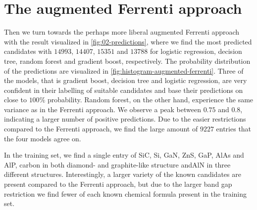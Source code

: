 \begin{comment}
\begin{table}[!ht]
\centering
\caption{Table of the number of predictions made with the optimal model for the insightful approach. }
\label{tab:timing-extraction}
\noindent\makebox[\textwidth]{
\begin{tabular}{M{3.0cm} M{4.0cm} M{4.0cm}}
  \hline
  \hline
   Model & Optimal number PC & Number of predictions \\
  \hline
  Logistic regression & $145$  & $454$ \\
  Decision trees      &  $3$   & $442$ \\
  Random forest       &  $10 $ & $325$ \\
  Gradient boost      &  $7$   & $699$ \\
  \hline
  \hline
\end{tabular}
}
\end{table}
\end{comment}


\section{The augmented Ferrenti approach}
Then we turn towards the perhaps more liberal augmented Ferrenti approach with the result visualized in \autoref{fig:02-predictions}, where we find the most predicted candidates with $14993$, $14407$, $15351$ and $13788$ for logistic regression, decision tree, random forest and gradient boost, respectively. The probability distribution of the predictions are visualized in \autoref{fig:histogram-augmented-ferrenti}. Three of the models, that is gradient boost, decision tree and logistic regression, are very confident in their labelling of suitable candidates and base their predictions on close to $100\%$ probability. Random forest, on the other hand, experience the same variance as in the Ferrenti approach. We observe a peak between $0.75$ and $0.8$, indicating a larger number of positive predictions. Due to the easier restrictions compared to the Ferrenti approach, we find the large amount of $9227$ entries that the four models agree on.



In the training set, we find a single entry of SiC, Si, GaN, ZnS, GaP, AlAs and AlP, carbon in both diamond- and graphite-like structure andAlN in three different structures. Interestingly, a larger variety of the known candidates are present compared to the Ferrenti approach, but due to the larger band gap restriction we find fewer of each known chemical formula present in the training set.

